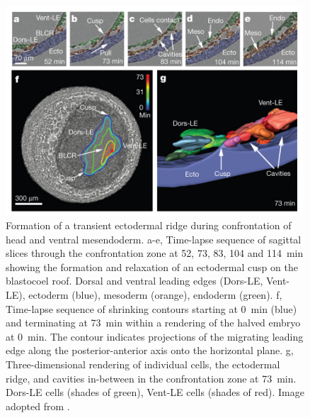 \documentclass[
twoside,
openright,
titlepage,
numbers=noenddot,
headinclude,
fleqn,
a4paper,
footinclude=true,
cleardoublepage=empty,
abstractoff,
BCOR=5mm,
paper=a4,
fontsize=11pt,
british,ngerman,american,
]{scrreprt}
\begin{document}
\begin{figure}
  \centering
  \includegraphics[width=0.99\textwidth]{figures/Nature/Fig-4.jpg}
  \caption[Formation of a transient ectodermal ridge during
  confrontation of head and ventral mesendoderm.]{%
    Formation of a transient ectodermal ridge during confrontation of
    head and ventral mesendoderm.  a-e, Time-lapse sequence of
    sagittal slices through the confrontation zone at 52, 73, 83, 104
    and \SI{114}{min} showing the formation and relaxation of an
    ectodermal cusp on the blastocoel roof.  Dorsal and ventral
    leading edges (Dors-LE, Vent-LE), ectoderm (blue), mesoderm
    (orange), endoderm (green). f, Time-lapse sequence of shrinking
    contours starting at \SI{0}{min} (blue) and terminating at
    \SI{73}{min} within a rendering of the halved embryo at
    \SI{0}{min}.  The contour indicates projections of the migrating
    leading edge along the posterior-anterior axis onto the horizontal
    plane.  g, Three-dimensional rendering of individual cells, the
    ectodermal ridge, and cavities in-between in the confrontation
    zone at \SI{73}{min}.  Dors-LE cells (shades of green), Vent-LE
    cells (shades of red).  Image adopted from
    \cite{Moosmann2013nature}.}
  \label{fig:bio-4}
\end{figure}
\end{document}
